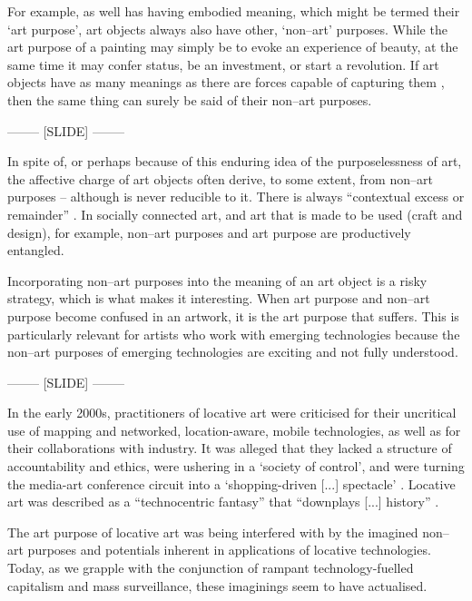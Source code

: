 \documentclass[letter:wpaper]{article}
\begin{document}
    For example, as well has having embodied meaning, which might be termed their ‘art purpose’, art objects always also have other, ‘non–art’ purposes. While the art purpose of a painting may simply be to evoke an experience of beauty, at the same time it may confer status, be an investment, or start a revolution. If art objects have as many meanings as there are forces capable of capturing them \citep[p.4]{DeleuzeNtschAndPhlsphy2006}, then the same thing can surely be said of their non–art purposes.

-------- [SLIDE] --------

    In spite of, or perhaps because of this enduring idea of the purposelessness of art, the affective charge of art objects often derive, to some extent, from non–art purposes -- although is never reducible to it. There is always ``contextual excess or remainder'' \citep[p.252]{MassumiPrblsFrThVrtl2002}. In socially connected art, and art that is made to be used (craft and design), for example, non–art purposes and art purpose are productively entangled. 
    
    Incorporating non–art purposes into the meaning of an art object is a risky strategy, which is what makes it interesting. When art purpose and non–art purpose become confused in an artwork, it is the art purpose that suffers. This is particularly relevant for artists who work with emerging technologies because the non–art purposes of emerging technologies are exciting and not fully understood.
    
-------- [SLIDE] --------

	In the early 2000s, practitioners of locative art were criticised for their uncritical use of mapping and networked, location-aware, mobile technologies, as well as for their collaborations with industry. It was alleged that they lacked a structure of accountability and ethics, were ushering in a `society of control', and were turning the media-art conference circuit into a `shopping-driven [...] spectacle' \citep[p.358]{beyondLocativeMedia2006}. Locative art was described as a ``technocentric fantasy'' that ``downplays [...] history'' \citep[para. 2]{questioningTheFrame2004}.
    
    The art purpose of locative art was being interfered with by the imagined non–art purposes and potentials inherent in applications of locative technologies. Today, as we grapple with the conjunction of rampant technology-fuelled capitalism and mass surveillance, these imaginings seem to have actualised. 
    
\end{document}
